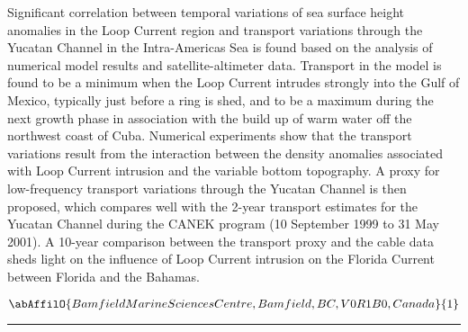 \noindent Significant correlation between temporal variations of sea surface height anomalies in the Loop Current region and transport variations through the Yucatan Channel in the Intra-Americas Sea is found based on the analysis of numerical model results and satellite-altimeter data. Transport in the model is found to be a minimum when the Loop Current intrudes strongly into the Gulf of Mexico, typically just before a ring is shed, and to be a maximum during the next growth phase in association with the build up of warm water off the northwest coast of Cuba. Numerical experiments show that the transport variations result from the interaction between the density anomalies associated with Loop Current intrusion and the variable bottom topography. A proxy for low-frequency transport variations through the Yucatan Channel is then proposed, which compares well with the 2-year transport estimates for the Yucatan Channel during the CANEK program (10 September 1999 to 31 May 2001). A 10-year comparison between the transport proxy and the cable data sheds light on the influence of Loop Current intrusion on the Florida Current between Florida and the Bahamas.

\begin{center}
   \vspace{2 mm} \begin{center}
    \vspace{2 mm}\begin{center}
  
  $\abAffilO{Bamfield Marine Sciences Centre, Bamfield, BC, V0R 1B0, Canada}{1}$

  \end{center}
  \vspace{2 mm}
  \end{center}\end{center}
  \begin{center}\rule{0.70\linewidth}{0.5 pt}\end{center}

